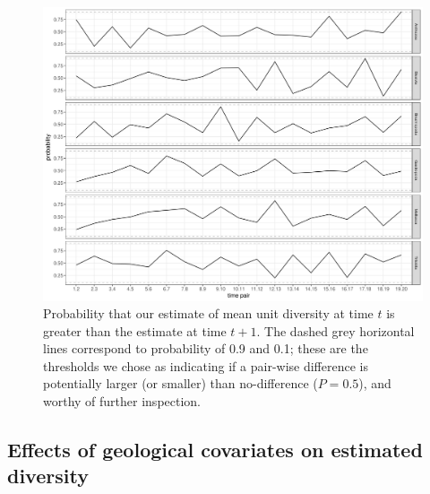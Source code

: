 \documentclass[12pt,letterpaper]{article}
\begin{document}
\begin{figure}[ht]
  \centering
  \includegraphics[width=\textwidth,height=0.5\textheight,keepaspectratio=true]{figure/unitdiv_diff_diversity}
  \caption{Probability that our estimate of mean unit diversity at time \(t\) is greater than the estimate at time \(t + 1\). The dashed grey horizontal lines correspond to probability of 0.9 and 0.1; these are the thresholds we chose as indicating if a pair-wise difference is potentially larger (or smaller) than no-difference (\(P = 0.5\)), and worthy of further inspection.}
  \label{fig:diff_div}
\end{figure}




\subsection{Effects of geological covariates on estimated diversity}
\end{document}
